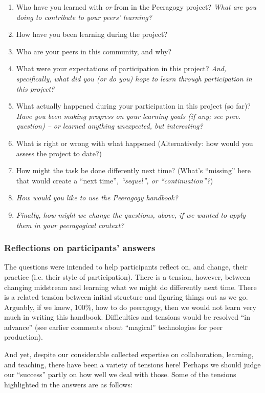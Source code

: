 \begin{enumerate}
\item
  Who have you learned with \emph{or} from in the Peeragogy project?
  \emph{What are you doing to contribute to your peers' learning?}
\item
  How have you been learning during the project?
\item
  Who are your peers in this community, and why?
\item
  What were your expectations of participation in this project?
  \emph{And, specifically, what did you (or do you) hope to learn
  through participation in this project?}
\item
  What actually happened during your participation in this project (so
  far)? \emph{Have you been making progress on your learning goals (if
  any; see prev. question) -- or learned anything unexpected, but
  interesting?}
\item
  What is right or wrong with what happened (Alternatively: how would
  you assess the project to date?)
\item
  How might the task be done differently next time? (What's ``missing''
  here that would create a ``next time''\emph{, ``sequel'', or
  ``continuation''?})
\item
  \emph{How would you like to use the Peeragogy handbook?}
\item
  \emph{Finally, how might we change the questions, above, if we wanted
  to apply them in your peeragogical context?}
\end{enumerate}

\subsubsection{\textbf{Reflections on participants' answers}}

The questions were intended to help participants reflect on, and change,
their practice (i.e. their style of participation). There is a tension,
however, between changing midstream and learning what we might do
differently next time. There is a related tension between initial
structure and figuring things out as we go. Arguably, if we knew, 100\%,
how to do peeragogy, then we would not learn very much in writing this
handbook. Difficulties and tensions would be resolved ``in advance''
(see earlier comments about ``magical'' technologies for peer
production).

And yet, despite our considerable collected expertise on collaboration,
learning, and teaching, there have been a variety of tensions here!
Perhaps we should judge our ``success'' partly on how well we deal with
those. Some of the tensions highlighted in the answers are as follows:

